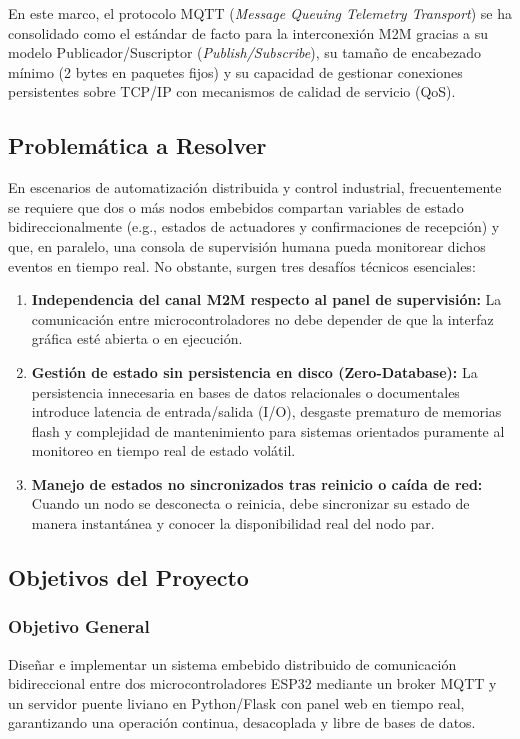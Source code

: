 \documentclass[11pt,a4paper]{article}
\begin{document}
En este marco, el protocolo MQTT (\textit{Message Queuing Telemetry Transport}) se ha consolidado como el estándar de facto para la interconexión M2M gracias a su modelo Publicador/Suscriptor (\textit{Publish/Subscribe}), su tamaño de encabezado mínimo (2 bytes en paquetes fijos) y su capacidad de gestionar conexiones persistentes sobre TCP/IP con mecanismos de calidad de servicio (QoS).

\subsection{Problemática a Resolver}
En escenarios de automatización distribuida y control industrial, frecuentemente se requiere que dos o más nodos embebidos compartan variables de estado bidireccionalmente (e.g., estados de actuadores y confirmaciones de recepción) y que, en paralelo, una consola de supervisión humana pueda monitorear dichos eventos en tiempo real. No obstante, surgen tres desafíos técnicos esenciales:
\begin{enumerate}
    \item \textbf{Independencia del canal M2M respecto al panel de supervisión:} La comunicación entre microcontroladores no debe depender de que la interfaz gráfica esté abierta o en ejecución.
    \item \textbf{Gestión de estado sin persistencia en disco (Zero-Database):} La persistencia innecesaria en bases de datos relacionales o documentales introduce latencia de entrada/salida (I/O), desgaste prematuro de memorias flash y complejidad de mantenimiento para sistemas orientados puramente al monitoreo en tiempo real de estado volátil.
    \item \textbf{Manejo de estados no sincronizados tras reinicio o caída de red:} Cuando un nodo se desconecta o reinicia, debe sincronizar su estado de manera instantánea y conocer la disponibilidad real del nodo par.
\end{enumerate}

\subsection{Objetivos del Proyecto}
\subsubsection{Objetivo General}
Diseñar e implementar un sistema embebido distribuido de comunicación bidireccional entre dos microcontroladores ESP32 mediante un broker MQTT y un servidor puente liviano en Python/Flask con panel web en tiempo real, garantizando una operación continua, desacoplada y libre de bases de datos.
\end{document}
